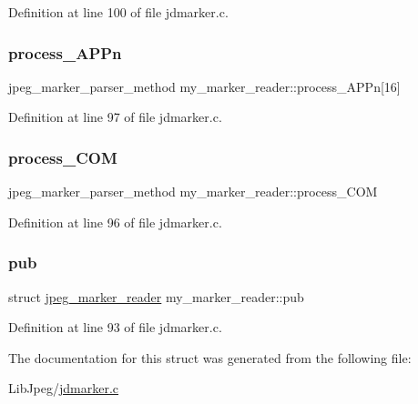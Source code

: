 Definition at line 100 of file jdmarker.\+c.

\mbox{\label{structmy__marker__reader_a3a466da71db30199ab019a03960013cc}} 
\subsubsection{\texorpdfstring{process\_APPn}{process\_APPn}}
{\footnotesize\ttfamily jpeg\+\_\+marker\+\_\+parser\+\_\+method my\+\_\+marker\+\_\+reader\+::process\+\_\+\+A\+P\+Pn\mbox{[}16\mbox{]}}



Definition at line 97 of file jdmarker.\+c.

\mbox{\label{structmy__marker__reader_a5e10e69e117d23840f04d54e7a3cdde5}} 
\subsubsection{\texorpdfstring{process\_COM}{process\_COM}}
{\footnotesize\ttfamily jpeg\+\_\+marker\+\_\+parser\+\_\+method my\+\_\+marker\+\_\+reader\+::process\+\_\+\+C\+OM}



Definition at line 96 of file jdmarker.\+c.

\mbox{\label{structmy__marker__reader_ac0d8a24c85575d304ef4383e8f6ca5fc}} 
\subsubsection{\texorpdfstring{pub}{pub}}
{\footnotesize\ttfamily struct \mbox{\hyperlink{structjpeg__marker__reader}{jpeg\+\_\+marker\+\_\+reader}} my\+\_\+marker\+\_\+reader\+::pub}



Definition at line 93 of file jdmarker.\+c.



The documentation for this struct was generated from the following file\+:\begin{DoxyCompactItemize}
\item 
Lib\+Jpeg/\mbox{\hyperlink{jdmarker_8c}{jdmarker.\+c}}\end{DoxyCompactItemize}
